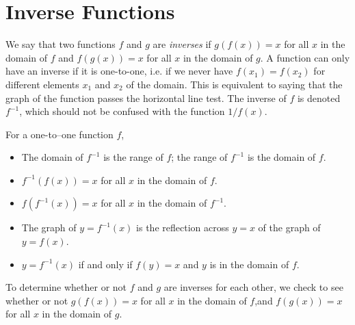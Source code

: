 \section{Inverse Functions}\label{sec:inv_funcs}

We say that two functions $f$ and $g$ are \emph{inverses} if $g(f(x))=x$ for all $x$ in the domain of $f$ and $f(g(x))=x$ for all $x$ in the domain of $g$. A function can only have an inverse if it is one-to-one, i.e. if we never have $f(x_1)=f(x_2)$ for different elements $x_1$ and $x_2$ of the domain. This is equivalent to saying that the graph of the function passes the horizontal line test.
%
The inverse of $f$ is denoted $f^{-1}$, which should not be confused with the function $1/f(x)$.

\begin{keyidea}\label{ki_inv_funcs}
For a one-to–one function $f$,
\begin{itemize}
\item The domain of $f^{-1}$ is the range of $f$; the range of $f^{-1}$ is the domain of $f$.
\item $f^{-1}(f(x))=x$ for all $x$ in the domain of $f$.
\item $f(f^{-1}(x))=x$ for all $x$ in the domain of $f^{-1}$.
\item The graph of $y=f^{-1}(x)$ is the reflection across $y=x$ of the graph of $y=f(x)$.
\item $y=f^{-1}(x)$ if and only if $f(y)=x$ and $y$ is in the domain of $f$.
\end{itemize}
\end{keyidea}


To determine whether or not $f$ and $g$ are inverses for each other, we check to see whether or not $g(f(x))=x$ for all $x$ in the domain of $f$,and $f(g(x))=x$ for all $x$ in the domain of $g$.

